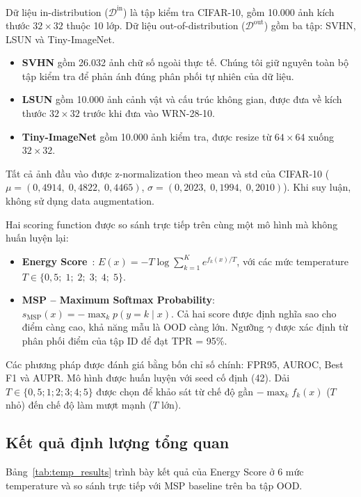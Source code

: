 \documentclass[12pt,a4paper]{article}
\begin{document}
Dữ liệu in-distribution ($\mathcal{D}^{\text{in}}$) là tập kiểm tra CIFAR-10, gồm 10.000 ảnh kích thước $32\times32$ thuộc 10 lớp. Dữ liệu out-of-distribution ($\mathcal{D}^{\text{out}}$) gồm ba tập: SVHN, LSUN và Tiny-ImageNet.
\begin{itemize}
    \item \textbf{SVHN} gồm 26.032 ảnh chữ số ngoài thực tế. Chúng tôi giữ nguyên toàn bộ tập kiểm tra để phản ánh đúng phân phối tự nhiên của dữ liệu.
    \item \textbf{LSUN} gồm 10.000 ảnh cảnh vật và cấu trúc không gian, được đưa về kích thước $32\times32$ trước khi đưa vào WRN-28-10.
    \item \textbf{Tiny-ImageNet} gồm 10.000 ảnh kiểm tra, được resize từ $64\times64$ xuống $32\times32$.
\end{itemize}

Tất cả ảnh đầu vào được z-normalization theo mean và std của CIFAR-10 ($\mu = (0{,}4914,\;0{,}4822,\;0{,}4465)$, $\sigma = (0{,}2023,\;0{,}1994,\;0{,}2010)$). Khi suy luận, không sử dụng data augmentation.

Hai scoring function được so sánh trực tiếp trên cùng một mô hình mà không huấn luyện lại:
\begin{itemize}
  \item \textbf{Energy Score}~\cite{energyood}: $E(x) = -T\log\sum_{k=1}^{K}e^{f_k(x)/T}$, với các mức temperature $T \in \{0{,}5;\;1;\;2;\;3;\;4;\;5\}$.
  \item \textbf{MSP -- Maximum Softmax Probability}: $s_{\text{MSP}}(x) = -\max_k p(y=k\mid x)$. Cả hai score được định nghĩa sao cho điểm càng cao, khả năng mẫu là OOD càng lớn. Ngưỡng $\gamma$ được xác định từ phân phối điểm của tập ID để đạt TPR = 95\%.
\end{itemize}
Các phương pháp được đánh giá bằng bốn chỉ số chính: FPR95, AUROC, Best F1 và AUPR. Mô hình được huấn luyện với seed cố định (42). Dải $T \in \{0{,}5; 1; 2; 3; 4; 5\}$ được chọn để khảo sát từ chế độ gần $-\max_k f_k(x)$ ($T$ nhỏ) đến chế độ làm mượt mạnh ($T$ lớn).

\subsection{Kết quả định lượng tổng quan}

Bảng~\ref{tab:temp_results} trình bày kết quả của Energy Score ở 6 mức temperature và so sánh trực tiếp với MSP baseline trên ba tập OOD.
\end{document}
